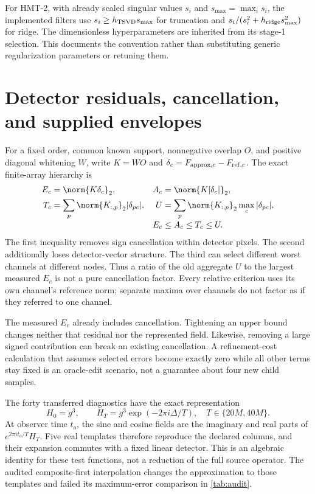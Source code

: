For HMT-2, with already scaled singular values $s_i$ and $s_{\max}=\max_i s_i$, the implemented filters use $s_i\geq h_{\rm TSVD}s_{\max}$ for truncation and $s_i/(s_i^2+h_{\rm ridge}s_{\max}^2)$ for ridge. The dimensionless hyperparameters are inherited from its stage-1 selection. This documents the convention rather than substituting generic regularization parameters or retuning them.

\section{Detector residuals, cancellation, and supplied envelopes}\label{app:bounds}
For a fixed order, common known support, nonnegative overlap $O$, and positive diagonal whitening $W$, write $K=WO$ and $\delta_c=F_{{\rm approx},c}-F_{{\rm ref},c}$. The exact finite-array hierarchy is
\begin{align}
E_c&=\norm{K\delta_c}_2,
&A_c&=\norm{K|\delta_c|}_2,\nonumber\\
T_c&=\sum_p\norm{K_{:,p}}_2|\delta_{pc}|,
&U&=\sum_p\norm{K_{:,p}}_2\max_c|\delta_{pc}|,\nonumber\\[-0.3em]
&&E_c&\leq A_c\leq T_c\leq U.
\label{eq:boundhierarchy}
\end{align}
The first inequality removes sign cancellation within detector pixels. The second additionally loses detector-vector structure. The third can select different worst channels at different nodes. Thus a ratio of the old aggregate $U$ to the largest measured $E_c$ is not a pure cancellation factor. Every relative criterion uses its own channel's reference norm; separate maxima over channels do not factor as if they referred to one channel.

The measured $E_c$ already includes cancellation. Tightening an upper bound changes neither that residual nor the represented field. Likewise, removing a large signed contribution can break an existing cancellation. A refinement-cost calculation that assumes selected errors become exactly zero while all other terms stay fixed is an oracle-edit scenario, not a guarantee about four new child samples.

The forty transferred diagnostics have the exact representation
\begin{equation}
H_0=g^3,\qquad H_T=g^3\exp(-2\pi i\Delta/T),\quad T\in\{20M,40M\}.
\end{equation}
At observer time $t_o$, the sine and cosine fields are the imaginary and real parts of $e^{2\pi i t_o/T}H_T$. Five real templates therefore reproduce the declared columns, and their expansion commutes with a fixed linear detector. This is an algebraic identity for these test functions, not a reduction of the full source operator. The audited composite-first interpolation changes the approximation to those templates and failed its maximum-error comparison in \cref{tab:audit}.

